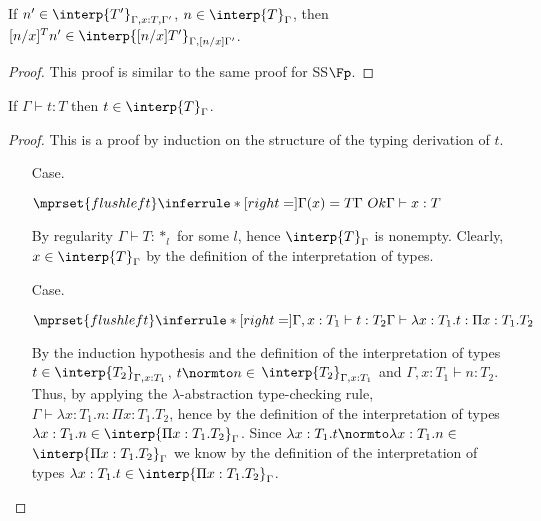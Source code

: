 \begin{lemma}
  If $n' \in \interp{T'}_{\Gamma,x:T,\Gamma'}$, $n \in \interp{T}_\Gamma$,
  then $[n/x]^T n' \in \interp{[n/x]T'}_{\Gamma,[n/x]\Gamma'}$.
  \label{lemma:interpretation_of_types_closed_substitution_ssfe}
\end{lemma}
\begin{proof}
  This proof is similar to the same proof for SS$\Fp$.
\end{proof}
\begin{thm}
  If $\Gamma \vdash t:T$ then $t \in \interp{T}_\Gamma$.
  \label{thm:soundness_ssfe}
\end{thm}
\begin{proof}
  This is a proof by induction on the structure of the typing derivation of $t$.
\begin{itemize}
\item[Case.]\ \\
  \begin{center}
    \begin{math}
      $$\mprset{flushleft}
      \inferrule* [right=] {
        \Gamma(x) = T 
        \\
        \Gamma\ Ok
      }{\Gamma \vdash x:T}
    \end{math}
  \end{center}
  By regularity $\Gamma \vdash T:*_l$ for some $l$, hence $\interp{T}_\Gamma$ is 
  nonempty.  Clearly, $x \in \interp{T}_\Gamma$ by the definition of the interpretation
  of types.
  
\item[Case.]\ \\
  \begin{center}
    \begin{math}
      $$\mprset{flushleft}
      \inferrule* [right=] {
        \Gamma,x:T_1 \vdash t:T_2
      }{\Gamma \vdash \lambda x:T_1.t : \Pi x:T_1.T_2}
    \end{math}
  \end{center}
  By the induction hypothesis and the definition of the interpretation of types 
  $t \in \interp{T_2}_{\Gamma,x:T_1}$, $t \normto n \in $
  $ \interp{T_2}_{\Gamma,x:T_1}$ and $\Gamma,x:T_1 \vdash n:T_2$.  Thus, by
  applying the $\lambda$-abstraction type-checking rule, 
  $\Gamma \vdash \lambda x:T_1.n:\Pi x:T_1.T_2$, hence by the definition of the 
  interpretation of types 
  $\lambda x:T_1.n \in \interp{\Pi x:T_1.T_2}_\Gamma$.  Since  
  $\lambda x:T_1.t \normto \lambda x:T_1.n \in $
  $\interp{\Pi x:T_1.T_2}_\Gamma$ we know by the definition of the interpretation of types
  $\lambda x:T_1.t \in \interp{\Pi x:T_1.T_2}_\Gamma$.


\end{itemize}
\end{proof}
